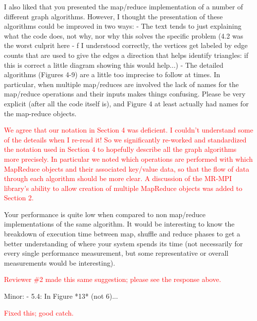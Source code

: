 \documentclass[11pt]{article}
\newcommand{\revise}[1]{\textcolor{red}{#1}}
\begin{document}
I also liked that you presented the map/reduce implementation of a
number of different graph algorithms. However, I thought the
presentation of these algorithms could be improved in two ways: - The
text tends to just explaining what the code does, not why, nor why
this solves the specific problem (4.2 was the worst culprit here - f I
understood correctly, the vertices get labeled by edge counts that are
used to give the edges a direction that helps identify triangles: if
this is correct a little diagram showing this would help...)  - The
detailed algorithms (Figures 4-9) are a little too imprecise to follow
at times. In particular, when multiple map/reduces are involved the
lack of names for the map/reduce operations and their inputs makes
things confusing. Please be very explicit (after all the code itself
is), and Figure 4 at least actually had names for the map-reduce
objects.

\revise{We agree that our notation in Section 4 was deficient.  I
couldn't understand some of the deteails when I re-read it!  So we
significantly re-worked and standardized the notation used in Section
4 to hopefully describe all the graph algorithms more precisely.  In
particular we noted which operations are performed with which
MapReduce objects and their associated key/value data, so that the
flow of data through each algorithm should be more clear.  A
discussion of the MR-MPI library's ability to allow creation of
multiple MapReduce objects was added to Section 2.}

Your performance is quite low when compared to non map/reduce
implementations of the same algorithm. It would be interesting to know the
breakdown of execution time between map, shuffle and reduce phases to get a
better understanding of where your system spends its time (not necessarily
for every single performance measurement, but some representative or
overall measurements would be interesting).

\revise{Reviewer \#2 made this same suggestion; please see the
response above.}

Minor:
- 5.4: In Figure *13* (not 6)...

\revise{Fixed this; good catch.}
\end{document}
